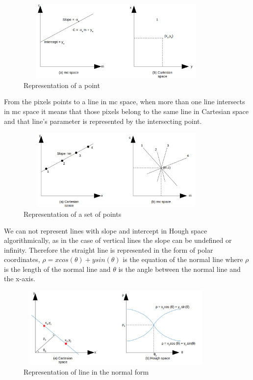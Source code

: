                     \begin{figure}[h]
    \centering
    \includegraphics[width=10cm, height =4cm]{images/hough2.png}
    \caption{Representation of a point}
    \end{figure}
    
    From the pixels points to a line in mc space, when more than one line intersects in mc space it means that those pixels belong to the same line in Cartesian space and that line's parameter is represented by the intersecting point. 
    
                 \begin{figure}[h]
    \centering
    \includegraphics[width=10cm, height =4cm]{images/hough3.png}
    \caption{Representation of a set of points}
    \end{figure}
    
    We can not represent lines with slope and intercept in Hough space algorithmically, as in the case of vertical lines the slope can be undefined or infinity. Therefore the straight line is represented in the form of polar coordinates, $\rho = xcos(\theta) + ysin(\theta) $ is the equation of the normal line where $\rho$ is the length of the normal line and $\theta$ is the angle between the normal line and the x-axis. 
    
    \begin{figure}[h]
    \centering
    \includegraphics[width=10cm, height =4cm]{images/hough4.png}
    \caption{Representation of line in the normal form}
    \end{figure}
    

